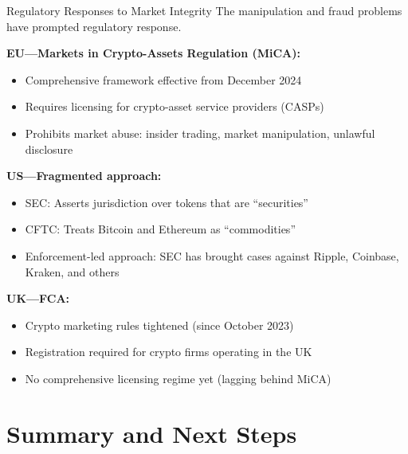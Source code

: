 \documentclass[10pt]{beamer}
\begin{document}
\begin{frame}{Regulatory Responses to Market Integrity}
  The manipulation and fraud problems have prompted regulatory response.
  
  \vspace{0.5em}
  \textbf{EU---Markets in Crypto-Assets Regulation (MiCA):}
  \begin{itemize}
    \item Comprehensive framework effective from December 2024
    \item Requires licensing for crypto-asset service providers (CASPs)
    \item Prohibits market abuse: insider trading, market manipulation, unlawful disclosure
  \end{itemize}
  
  \vspace{0.3em}
  \textbf{US---Fragmented approach:}
  \begin{itemize}
    \item SEC: Asserts jurisdiction over tokens that are ``securities'' %
    \item CFTC: Treats Bitcoin and Ethereum as ``commodities''
    \item Enforcement-led approach: SEC has brought cases against Ripple, Coinbase, Kraken, and others
  \end{itemize}
  
  \vspace{0.3em}
  \textbf{UK---FCA:}
  \begin{itemize}
    \item Crypto marketing rules tightened (since October 2023)
    \item Registration required for crypto firms operating in the UK
    \item No comprehensive licensing regime yet (lagging behind MiCA)
  \end{itemize}
\end{frame}

\section{Summary and Next Steps}
\end{document}

